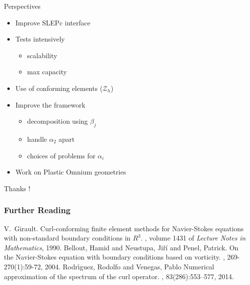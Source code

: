 \documentclass{beamer}
\newcommand{\Z}{{\bm{\mathcal{Z}}}}
\begin{document}
\begin{frame}{Perspectives}
  \begin{itemize}
  \item Improve SLEPc interface
  \item Tests intensively
    \begin{itemize}
    \item scalability
    \item max capacity
    \end{itemize}
  \item Use of conforming elements ($\Z_h$)
  \item Improve the framework
    \begin{itemize}
    \item decomposition using $\beta_j$
    \item handle $\alpha_2$ apart
    \item choices of problems for $\alpha_i$
    \end{itemize}
  \item Work on Plastic Omnium geometries 
  \end{itemize}
\end{frame}

\begin{frame}
  \begin{center}
    Thanks !
  \end{center}
\end{frame}

\begin{frame}[allowframebreaks]
  \frametitle<presentation>{Further Reading}
  \begin{thebibliography}{10}
    \beamertemplatebookbibitems
    V.~Girault.
    \newblock Curl-conforming finite element methods for Navier-Stokes equations with non-standard boundary conditions in $R^3$.
    , volume 1431 of {\em Lecture Notes in Mathematics}, 1990.
    \beamertemplatearticlebibitems
    Bellout, Hamid and Neustupa, Jiří and Penel, Patrick.
    \newblock On the Navier-Stokes equation with boundary conditions based on vorticity.
    , 269-270(1):59-72, 2004.
    \beamertemplatearticlebibitems
    Rodr\'{\i}guez, Rodolfo and Venegas, Pablo
    \newblock Numerical approximation of the spectrum of the curl operator.
    , 83(286):553–577, 2014.
  \end{thebibliography}
\end{frame}
\end{document}
